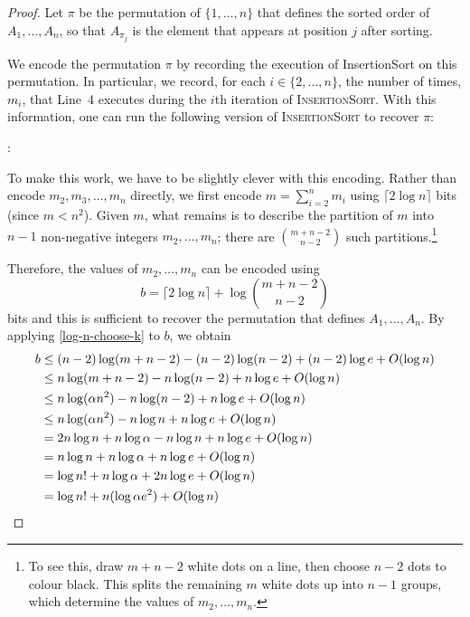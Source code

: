 \documentclass[lotsofwhite]{patmorin}
\begin{document}
\begin{proof}
Let $\pi$ be the permutation of $\{1,\ldots,n\}$ that defines the
sorted order of $A_1,\ldots,A_n$, so that $A_{\pi_j}$ is the element
that appears at position $j$ after sorting.

We encode the permutation $\pi$ by recording the execution of
InsertionSort on this permutation. In particular, we record, for each
$i\in\{2,\ldots,n\}$, the number of times, $m_i$, that Line~4 executes
during the $i$th iteration of \textsc{InsertionSort}. With this information,
one can run the following version of \textsc{InsertionSort} to recover $\pi$:

:
\begin{algorithmic}[1]
     \ENDFOR
  \ENDFOR
\end{algorithmic}
 
To make this work, we have to be slightly clever with this
encoding. Rather than encode $m_2,m_3,\ldots,m_n$ directly, we first
encode $m=\sum_{i=2}^{n} m_i$ using $\lceil 2\log n\rceil$ bits (since $m < n^2$). Given $m$, what
remains is to describe the partition of $m$ into $n-1$ non-negative
integers $m_2,\ldots,m_n$; there are $\binom{m+n-2}{n-2}$ such
partitions.\footnote{To see this, draw $m+n-2$ white dots on a line,
then choose $n-2$ dots to colour black. This splits the remaining $m$ white dots
up into $n-1$ groups, which determine the values of $m_2,\ldots,m_n$.}

Therefore, the values of $m_2,\ldots,m_n$ can be encoded using
\[
    b = \lceil 2\log n\rceil + \log\binom{m+n-2}{n-2}
\]
bits and this is sufficient to recover the permutation that defines
$A_1,\ldots,A_n$.  By applying \eqref{log-n-choose-k} to $b$, we obtain
\begin{align*}
  b & \le (n-2)\log(m+n-2) - (n-2)\log(n-2)  + (n-2)\log e + O(\log n) \\
    & \le n\log(m+n-2) - n\log(n-2)  + n\log e + O(\log n) \\
    & \le n\log(\alpha n^2) - n\log(n-2)  + n\log e + O(\log n) \\
    & \le n\log(\alpha n^2) - n\log n  + n\log e + O(\log n) \\
    & = 2n\log n + n\log\alpha - n\log n  + n\log e + O(\log n) \\
    & = n\log n + n\log\alpha + n\log e + O(\log n) \\
    & = \log n! + n\log\alpha + 2n\log e + O(\log n) \\
    & = \log n! + n(\log \alpha e^2) + O(\log n)  \qedhere
\end{align*}
\end{proof}
\end{document}
